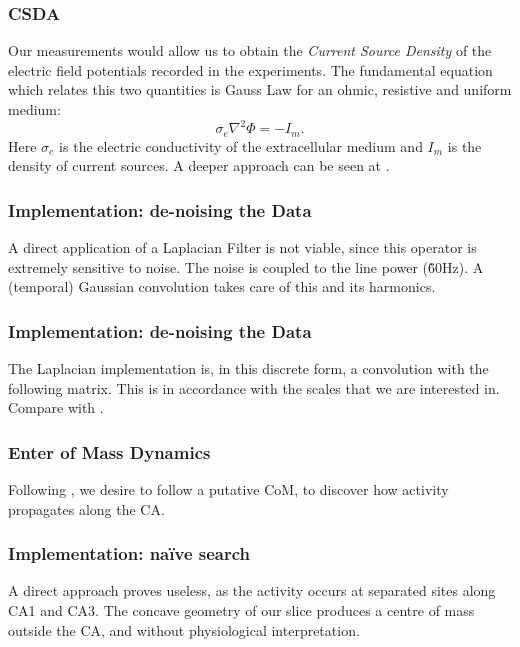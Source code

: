 \documentclass[xetex,mathserif,serif]{beamer}
\begin{document}
  \begin{frame}
    \frametitle{CSDA}
    Our measurements would allow us to obtain the \emph{Current Source Density}
    of the electric field potentials  recorded in the experiments.
    The fundamental equation which relates this two quantities is
    Gauss Law for an ohmic, resistive and uniform medium:
    \begin{equation}
      \sigma_e \nabla^2 \Phi = -I_m.
    \end{equation}
    Here $\sigma_e$ is the electric conductivity of the extracellular medium
    and $I_m$ is the density of current sources. A deeper approach
    can be seen at \cite{Bedard11}.
    
  \end{frame}

   \begin{frame}
     \frametitle{Implementation: de-noising the Data}
     A direct application of a Laplacian Filter is not viable, since
     this operator is extremely sensitive to noise. The noise is coupled
     to the line power (\~ 60Hz). A (temporal) Gaussian convolution takes care
     of this and its harmonics.
  \end{frame}


  \begin{frame}
     \frametitle{Implementation: de-noising the Data}
     The Laplacian implementation is, in this discrete form, a convolution
     with the following matrix. This is in accordance with the
     scales that we are interested in. Compare with \cite{Vaknin88}.
    
  \end{frame}


  \begin{frame}
     \frametitle{Enter of Mass Dynamics}
     Following \cite{Manjarrez07}, we desire to follow a putative CoM,
     to discover how activity propagates along the CA.
     
  \end{frame}


  

  \begin{frame}
     \frametitle{Implementation: naïve search}
     A direct approach proves useless, as the activity occurs at separated
     sites along CA1 and CA3. The concave geometry of our slice
     produces a centre of mass outside the CA, and without physiological
     interpretation.
  \end{frame}
\end{document}
